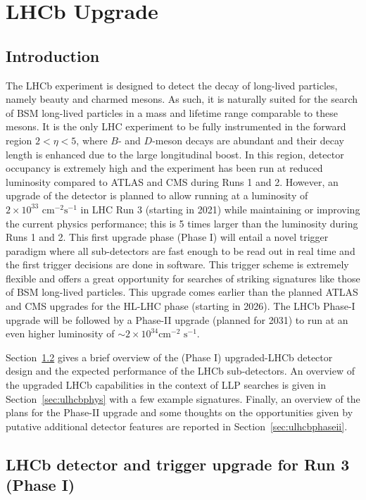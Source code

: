 \section{LHCb Upgrade}\label{sec:LHCb_upgrade}
\subsection{Introduction}

The LHCb experiment is designed to detect the decay of long-lived particles, namely beauty and charmed mesons. As such, it is naturally suited for the search of BSM long-lived particles in a mass and lifetime range comparable to these mesons. It is the only LHC experiment to be fully instrumented in the forward region $2<\eta<5$, where $B$- and $D$-meson decays are abundant and their decay length is enhanced due to the large longitudinal boost. In this region, detector occupancy is extremely high and the experiment has been run at reduced luminosity compared to ATLAS and CMS during Runs 1 and 2. However, an upgrade of the detector is planned to allow running at a luminosity of $2\times 10^{33}\,\,\text{cm}^{-2}\text{s}^{-1}$ in LHC Run 3 (starting in 2021) while maintaining or improving the current physics performance; this is 5 times larger than the luminosity during Runs 1 and 2. This first upgrade phase (Phase I) will entail a novel trigger paradigm where all sub-detectors are fast enough to be read out in real time and the first trigger decisions are done in software. This trigger scheme is  extremely flexible and offers a great opportunity for searches of striking signatures like those of BSM long-lived particles. This upgrade comes earlier than the planned ATLAS and CMS upgrades for the HL-LHC phase (starting in 2026). The LHCb Phase-I upgrade will be followed by a Phase-II upgrade (planned for 2031) to run at an even higher luminosity of $\sim 2\times 10^{34}\text{cm}^{-2}\,\,\text{s}^{-1}$. 

Section~\ref{sec:ulhcbperf} gives a brief overview of the (Phase I) upgraded-LHCb detector design and the expected performance of the LHCb sub-detectors. 
An overview of the upgraded LHCb capabilities in the context of LLP searches is given in Section~\ref{sec:ulhcbphys} with a few example signatures. 
Finally, an overview of the plans for the Phase-II upgrade and some thoughts on the opportunities given by putative additional detector features are reported in Section~\ref{sec:ulhcbphaseii}.



\subsection{LHCb detector and trigger upgrade for Run 3 (Phase I)}
\label{sec:ulhcbperf}

